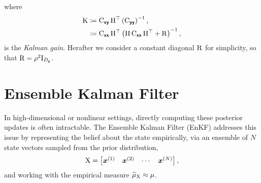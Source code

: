 \documentclass[wcp]{jmlr} %
\begin{document}
where
\begin{align}
\mathrm{K}
&\coloneq \mathrm{C}_{\boldsymbol{\mathsf{xy}}}\,\mathrm{H}^\top \left(\mathrm{C}_{\boldsymbol{\mathsf{yy}}}\right)^{-1},\label{eq:kalman-gain}\\
&\coloneq \mathrm{C}_{\boldsymbol{\mathsf{xx}}}\,\mathrm{H}^\top \left(\mathrm{H}\,\mathrm{C}_{\boldsymbol{\mathsf{xx}}}\,\mathrm{H}^\top + \mathrm{R}\right)^{-1},
\end{align}
is the \emph{Kalman gain}.
Herafter we consider a constant diagonal \(\mathrm{R}\) for simplicity, so that \(\mathrm{R}=\rho^2\mathrm{I}_{D_{\boldsymbol{\mathsf{y}}}}\).

\section{Ensemble Kalman Filter}

In high-dimensional or nonlinear settings, directly computing these posterior updates is often intractable.
The Ensemble Kalman Filter (EnKF) addresses this issue by representing the belief about the state empirically, via an ensemble of \(N\) state vectors sampled from the prior distribution,
\begin{align}
    \mathrm{X} = \begin{bmatrix} \boldsymbol{x}^{(1)} & \boldsymbol{x}^{(2)} & \cdots & \boldsymbol{x}^{(N)} \end{bmatrix},
\end{align}
and working with the empirical measure $\ELaw[\mm{X}]\approx \Law$.
\end{document}
